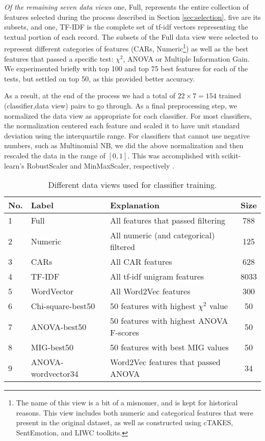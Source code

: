 \textit{Of the remaining seven data views} one, \textsf{Full}, represents 
the entire collection of features selected during
the process described in Section \ref{sec:selection}, five are its subsets,
and one, \textsf{TF-IDF} is the complete set of tf-idf vectors
representing the textual portion of each record. The subsets
of the \textsf{Full} data view were selected to represent different categories
of features (\textsf{CARs}, \textsf{Numeric}\footnote{The name
of this view is a bit of a misnomer, and is kept for historical reasons.
This view includes both numeric and categorical features that
were present in the original dataset, as well as constructed
using \textsf{cTAKES}, SentEmotion, and \textsf{LIWC} toolkits.}) as well
as the best features that passed a specific test: $\chi^2$, ANOVA or Multiple
Information Gain. We experimented briefly with top 100 and top 75 best features
for each of the tests, but settled on top 50, as this provided better accuracy.

As a result, at the end of the process we had a total of $22\times 7 = 154$
trained (classifier,data view) pairs to go through. As a final preprocessing step, we normalized the data view as appropriate for each classifier. For most classifiers, the normalization centered each feature and scaled it to have unit standard deviation using the interquartile range. For classifiers that cannot use negative numbers, such as Multinomial NB, we did the above normalization and then rescaled the data in the range of $[0, 1]$. This was accomplished with \textsf{scikit-learn}'s \textsf{RobustScaler} and \textsf{MinMaxScaler}, respectively \cite{scikit-learn}. 


\begin{table}[]
    \centering
    \begin{tabular}{|l|l|l|c|}
    \hline
    \textsf{No.} & \textsf{Label} & \textsf{Explanation} & \textsf{Size}\\
    \hline
        1 & \textsf{Full} & All features that passed filtering & 788 \\ 
        2 & \textsf{Numeric} & All numeric (and categorical) filtered & 125\\ 
        3 & \textsf{CARs} & All CAR features & 628 \\
        4 & \textsf{TF-IDF} & All tf-idf unigram features & 8033\\
        5 & \textsf{WordVector}& All \textsf{Word2Vec} features & 300\\
        6 & \textsf{Chi-square-best50}& 50 features with highest $\chi^2$ value & 50\\
        7 & \textsf{ANOVA-best50} & 50 features with highest ANOVA F-scores & 50 \\
        8 & \textsf{MIG-best50} & 50 features with best MIG values & 50 \\
        9 & \textsf{ANOVA-wordvector34}& \textsf{Word2Vec} features that passed ANOVA& 34\\
    \hline
    \end{tabular}
    \caption{Different data views used for classifier training.}
    \label{tab:dataviews}
\end{table}

